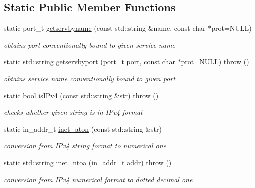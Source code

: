 \subsection*{Static Public Member Functions}
\begin{CompactItemize}
\item 
static port\_\-t \hyperlink{classsocketpp_1_1AddrHandler_b4a42f2b0f3842d681ea0cbe6810d6ff}{getservbyname} (const std::string \&name, const char $\ast$prot=NULL)
\begin{CompactList}\small\item\em obtains port conventionally bound to given service name \item\end{CompactList}\item 
static std::string \hyperlink{classsocketpp_1_1AddrHandler_f221cac56bf3808494806d335a56bb87}{getservbyport} (port\_\-t port, const char $\ast$prot=NULL)  throw ()
\begin{CompactList}\small\item\em obtains service name conventionally bound to given port \item\end{CompactList}\item 
static bool \hyperlink{classsocketpp_1_1AddrHandler_652e24c273f7905cebf8d04b3cfef74d}{isIPv4} (const std::string \&str)  throw ()
\begin{CompactList}\small\item\em checks whether given string is in IPv4 format \item\end{CompactList}\item 
static in\_\-addr\_\-t \hyperlink{classsocketpp_1_1AddrHandler_e2eda37cd4c20059c557e4e65c829cf8}{inet\_\-aton} (const std::string \&str)
\begin{CompactList}\small\item\em conversion from IPv4 string format to numerical one \item\end{CompactList}\item 
static std::string \hyperlink{classsocketpp_1_1AddrHandler_a4377d84c8ea976aeada2b2eb0ac248d}{inet\_\-ntoa} (in\_\-addr\_\-t addr)  throw ()
\begin{CompactList}\small\item\em conversion from IPv4 numerical format to dotted decimal one \item\end{CompactList}\end{CompactItemize}


